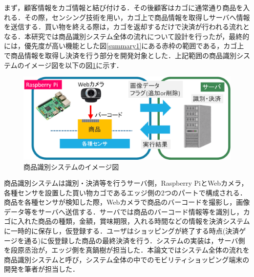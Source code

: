 まず，顧客情報をカゴ情報と結び付ける．その後顧客はカゴに通常通り商品を入れる．その際，センシング技術を用い，カゴ上で商品情報を取得しサーバへ情報を送信する．買い物を終える際は，カゴを返却するだけで決済が行われる流れとなる．本研究では商品識別システム全体の流れについて設計を行ったが，最終的には，優先度が高い機能とした図\ref{summary1}にある赤枠の範囲である，カゴ上で商品情報を取得し決済を行う部分を開発対象とした．上記範囲の商品識別システムのイメージ図を以下の図\ref{summary2}に示す．


\begin{figure}[htbp]
\centering
\includegraphics[width = 15cm]{./picture/summary2.eps}
\caption{商品識別システムのイメージ図}
\label{summary2}
\end{figure}


商品識別システムは識別・決済等を行うサーバ側，Raspberry PiとWebカメラ，各種センサを設置した買い物カゴであるエッジ側の2つのパートで構成される．商品を各種センサが検知した際，Webカメラで商品のバーコードを撮影し，画像データ等をサーバへ送信する．サーバでは商品のバーコード情報等を識別し，カゴに入れた商品の種類，金額，賞味期限，入れる時間などの情報を決済システムに一時的に保存し，仮登録する．ユーザはショッピングが終了する時点(決済ゲージを通る)に仮登録した商品の最終決済を行う．システムの実装は，サーバ側を段原丞治が，エッジ側を真鍋樹が担当した．本論文ではシステム全体の流れを商品識別システムと呼び，システム全体の中でのモビリティショッピング端末の開発を筆者が担当した．